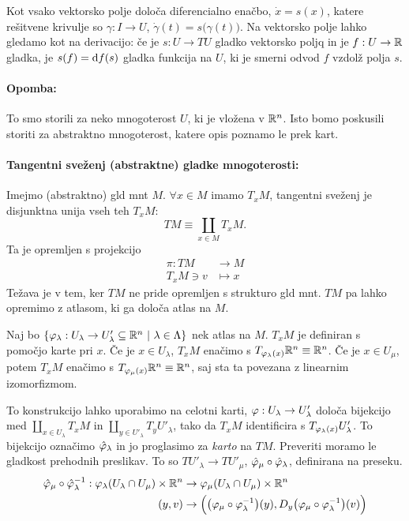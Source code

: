 Kot vsako vektorsko polje dolo\v ca diferencialno ena\v cbo, $\dot{x} = s(x)$, katere re\v sitvene krivulje so $\gamma : I \to U$, $\dot{\gamma}(t) =
s\big(\gamma(t)\big)$. Na vektorsko polje lahko gledamo kot na derivacijo: \v ce je $s : U \to TU$ gladko vektorsko poljq in je $f : U \to \mathbb{R}$ gladka,
je $s(f) = \text{d} f(s)$ gladka funkcija na $U$, ki je smerni odvod $f$ vzdol\v z polja $s$.

\paragraph{Opomba:} To smo storili za neko mnogoterost $U$, ki je vlo\v zena v $\mathbb{R}^n$. Isto bomo poskusili storiti za abstraktno mnogoterost, katere
opis poznamo le prek kart.

\begin{defin}
	\paragraph{Tangentni sve\v zenj (abstraktne) gladke mnogoterosti:} Imejmo (abstraktno) gld mnt $M$. $\forall x \in M$ imamo $T_x M$, tangentni
	sve\v zenj je disjunktna unija vseh teh $T_x M$:
	\[
		TM \equiv \coprod_{x \in M} T_xM.
	\]
	Ta je opremljen s projekcijo 
	\begin{align*}
		\pi : TM &\to M \\
		T_xM \owns v &\mapsto x
	\end{align*}
	Te\v zava je v tem, ker $TM$ ne pride opremljen s strukturo gld mnt. $TM$ pa lahko opremimo z atlasom, ki ga dolo\v ca atlas na $M$.
	
	Naj bo $\{\varphi_\lambda : U_\lambda \to U'_\lambda \subseteq \mathbb{R}^n\ |\ \lambda \in \Lambda\}$ nek atlas na $M$. $T_xM$ je definiran s
	pomo\v cjo karte pri $x$. \v Ce je $x \in U_\lambda$, $T_xM$ ena\v cimo s $T_{\varphi_\lambda(x)}\mathbb{R}^n \equiv \mathbb{R}^n$. \v Ce je $x \in U_\mu$,
	potem $T_xM$ ena\v cimo s $T_{\varphi_\mu(x)}\mathbb{R}^n \equiv \mathbb{R}^n$, saj sta ta povezana z linearnim izomorfizmom.

	To konstrukcijo lahko uporabimo na celotni karti, $\varphi : U_\lambda \to U'_\lambda$ dolo\v ca bijekcijo med $\coprod_{x \in U_\lambda}
	T_xM$ in $\coprod_{y \in U'_\lambda} T_yU'_\lambda$, tako da $T_xM$ identificira s $T_{\varphi_\lambda(x)}U'_\lambda$. To bijekcijo
	ozna\v cimo $\hat{\varphi}_\lambda$ in jo proglasimo za \emph{karto} na $TM$. Preveriti moramo le gladkost prehodnih preslikav. To so
	$TU'_\lambda \to TU'_\mu$, $\hat{\varphi}_\mu \circ \hat{\varphi}_\lambda$, definirana na preseku.
	\begin{align*}
		\hat{\varphi}_\mu \circ \hat{\varphi}^{-1}_\lambda : \varphi_\lambda (U_\lambda \cap U_\mu) \times \mathbb{R}^n &\to \varphi_\mu (U_\lambda \cap U_\mu)
			\times \mathbb{R}^n \\
		(y, v) &\to \Big(\big(\varphi_\mu \circ \varphi^{-1}_\lambda\big)(y), D_y\big(\varphi_\mu \circ \varphi^{-1}_\lambda\big)(v)\Big)
	\end{align*}
\end{defin}

